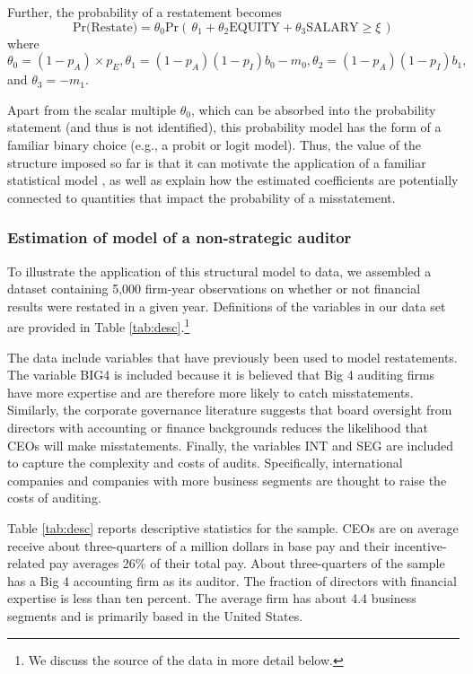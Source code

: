 Further, the probability of a restatement becomes
\begin{equation} \label{restate1}
\mbox{Pr(Restate)} = \theta_0 \mbox{Pr}\left(\, \theta_1 + \theta_2 \mbox{EQUITY} + \theta_3 \mbox{SALARY}  \ge \xi \,\right)
\end{equation}
where $\theta_0=(1-p_A) \times p_{E}, \theta_1 = (1 - p_A)(1 - p_I) b_0 - m_0, 
\theta_2 = (1 - p_A)(1 - p_I) b_1,$ and $\theta_3 = - m_1$. 

Apart from the scalar multiple $\theta_0$, which can be absorbed into the probability statement (and thus is not identified), this probability model has the form of  a familiar binary choice (e.g., a probit or logit model).
Thus, the value of the structure imposed so far is that it can motivate the application of a familiar statistical model \citep[as in]{Efendi:2007ja}, as well as explain how the estimated coefficients are potentially connected to quantities that impact the probability of a misstatement.

\subsubsection{Estimation of model of a non-strategic auditor}
To illustrate the application of this structural model to data, we assembled a dataset containing 5,000 firm-year observations on whether or not financial results were restated in a given year.
Definitions of the variables in our data set are provided in Table \ref{tab:desc}.\footnote{
We discuss the source of the data in more detail below.}

The data include variables that have previously been used to model restatements.
The variable BIG4 is included because it is believed that Big 4 auditing firms have more expertise and are therefore more likely to catch misstatements. 
Similarly, the corporate governance literature suggests that board oversight from directors with accounting or finance backgrounds reduces the likelihood that CEOs will make misstatements. 
Finally, the variables INT and SEG are included to capture the complexity and costs of audits. 
Specifically, international companies and companies with more business segments are thought to raise the costs of auditing. 

Table \ref{tab:desc} reports descriptive statistics for the sample. 
CEOs are on average receive about three-quarters of a million dollars in base pay and their incentive-related pay averages 26\% of their total pay.
About three-quarters of the sample has a Big 4 accounting firm as its auditor. 
The fraction of directors with financial expertise is less than ten percent. 
The average firm has about 4.4 business segments and is primarily based in the United States.

